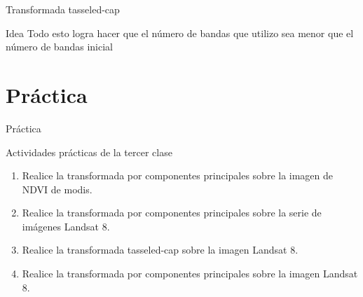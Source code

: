 \documentclass[]{beamer}
\begin{document}
\begin{frame}{Transformada tasseled-cap}
  \begin{block}{Idea}
    Todo esto logra hacer que el número de bandas que utilizo sea menor que el
      número de bandas inicial
  \end{block}
\end{frame}
\section{Práctica}

\begin{frame}{Práctica}
  \begin{exampleblock}{Actividades prácticas de la tercer clase}
    \begin{enumerate}
        \item Realice la transformada por componentes principales sobre la
            imagen de NDVI de modis.
        \item Realice la transformada por componentes principales sobre la 
            serie de imágenes Landsat 8.
        \item Realice la transformada tasseled-cap sobre la imagen Landsat 8.
        \item Realice la transformada por componentes principales sobre la
            imagen Landsat 8.
    \end{enumerate}
  \end{exampleblock}
\end{frame}
\end{document}
